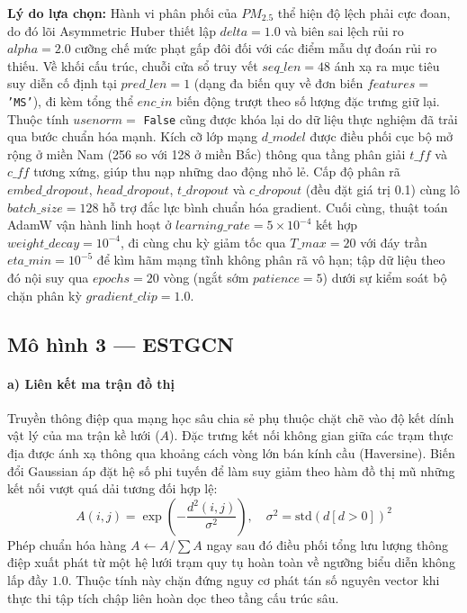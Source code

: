 \textbf{Lý do lựa chọn:} Hành vi phân phối của $PM_{2.5}$ thể hiện độ lệch phải cực đoan, do đó lõi Asymmetric Huber thiết lập $delta = 1.0$ và biên sai lệch rủi ro $alpha = 2.0$ cưỡng chế mức phạt gấp đôi đối với các điểm mẫu dự đoán rủi ro thiếu. Về khối cấu trúc, chuỗi cửa sổ truy vết $seq\_len=48$ ánh xạ ra mục tiêu suy diễn cố định tại $pred\_len=1$ (dạng đa biến quy về đơn biến $features=$ \texttt{'MS'}), đi kèm tổng thể $enc\_in$ biến động trượt theo số lượng đặc trưng giữ lại. Thuộc tính $usenorm=$ \texttt{False} cũng được khóa lại do dữ liệu thực nghiệm đã trải qua bước chuẩn hóa mạnh. Kích cỡ lớp mạng $d\_model$ được điều phối cục bộ mở rộng ở miền Nam (256 so với 128 ở miền Bắc) thông qua tầng phân giải $t\_ff$ và $c\_ff$ tương xứng, giúp thu nạp những dao động nhỏ lẻ. Cấp độ phân rã $embed\_dropout$, $head\_dropout$, $t\_dropout$ và $c\_dropout$ (đều đặt giá trị 0.1) cùng lô $batch\_size=128$ hỗ trợ đắc lực bình chuẩn hóa gradient. Cuối cùng, thuật toán AdamW vận hành linh hoạt ở $learning\_rate=5 \times 10^{-4}$ kết hợp $weight\_decay=10^{-4}$, đi cùng chu kỳ giảm tốc qua $T\_max=20$ với đáy trần $eta\_min=10^{-5}$ để kìm hãm mạng tĩnh không phân rã vô hạn; tập dữ liệu theo đó nội suy qua $epochs=20$ vòng (ngắt sớm $patience=5$) dưới sự kiểm soát bộ chặn phân kỳ $gradient\_clip=1.0$.

\subsection{Mô hình 3 --- ESTGCN}

\paragraph{a) Liên kết ma trận đồ thị}

Truyền thông điệp qua mạng học sâu chia sẻ phụ thuộc chặt chẽ vào độ kết dính vật lý của ma trận kề lưới ($A$). Đặc trưng kết nối không gian giữa các trạm thực địa được ánh xạ thông qua khoảng cách vòng lớn bán kính cầu (Haversine). Biến đổi Gaussian áp đặt hệ số phi tuyến để làm suy giảm theo hàm đồ thị mũ những kết nối vượt quá dải tương đối hợp lệ:
\begin{equation}
    A(i,j) = \exp\left(-\frac{d^2(i,j)}{\sigma^2}\right), \quad \sigma^2 = \text{std}(d[d>0])^2
\end{equation}
Phép chuẩn hóa hàng $A \leftarrow A / \sum A$ ngay sau đó điều phối tổng lưu lượng thông điệp xuất phát từ một hệ lưới trạm quy tụ hoàn toàn về ngưỡng biểu diễn không lấp đầy $1.0$. Thuộc tính này chặn đứng nguy cơ phát tán số nguyên vector khi thực thi tập tích chập liên hoàn dọc theo tầng cấu trúc sâu.

